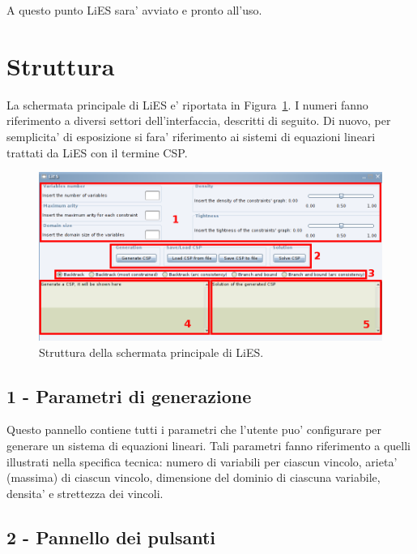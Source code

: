 \documentclass{article}
\begin{document}
A questo punto LiES sara' avviato e pronto all'uso.


\section{Struttura}
\label{sec:struttura}

La schermata principale di LiES e' riportata in Figura~\ref{fig:struttura}. I numeri fanno riferimento a diversi settori dell'interfaccia, descritti di seguito. Di nuovo, per semplicita' di esposizione si fara' riferimento ai sistemi di equazioni lineari trattati da LiES con il termine CSP.

\begin{figure}[htp!]
	\centering
	\includegraphics[scale=.4]{ug-images/structure.png}
	\caption{Struttura della schermata principale di LiES.}
	\label{fig:struttura}
\end{figure}

\subsection{1 - Parametri di generazione} 

Questo pannello contiene tutti i parametri che l'utente puo' configurare per generare un sistema di equazioni lineari. Tali parametri fanno riferimento a quelli illustrati nella specifica tecnica: numero di variabili per ciascun vincolo, arieta' (massima) di ciascun vincolo, dimensione del dominio di ciascuna variabile, densita' e strettezza dei vincoli.

\subsection{2 - Pannello dei pulsanti}
\end{document}
